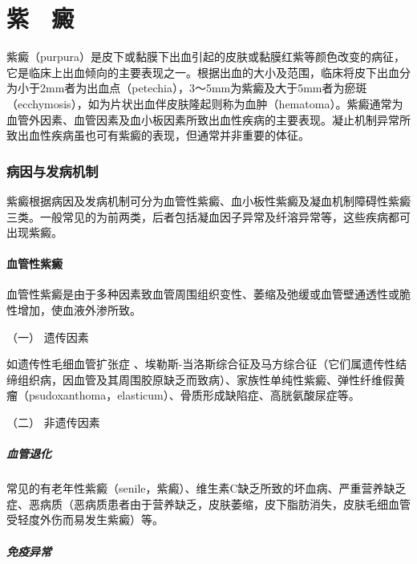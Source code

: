 \protect\hypertarget{text00036.html}{}{}

\chapter{紫　癜}

紫癜（purpura）是皮下或黏膜下出血引起的皮肤或黏膜红紫等颜色改变的病征，它是临床上出血倾向的主要表现之一。根据出血的大小及范围，临床将皮下出血分为小于2mm者为出血点（petechia），3～5mm为紫癜及大于5mm者为瘀斑（ecchymosis），如为片状出血伴皮肤隆起则称为血肿（hematoma）。紫癜通常为血管外因素、血管因素及血小板因素所致出血性疾病的主要表现。凝止机制异常所致出血性疾病虽也可有紫癜的表现，但通常并非重要的体征。

\subsection{病因与发病机制}

紫癜根据病因及发病机制可分为血管性紫癜、血小板性紫癜及凝血机制障碍性紫癜三类。一般常见的为前两类，后者包括凝血因子异常及纤溶异常等，这些疾病都可出现紫癜。

\subsubsection{血管性紫癜}

血管性紫癜是由于多种因素致血管周围组织变性、萎缩及弛缓或血管壁通透性或脆性增加，使血液外渗所致。

\hypertarget{text00036.htmlux5cux23CHP1-14-1-1-1}{}
（一） 遗传因素

如遗传性毛细血管扩张症
、埃勒斯-当洛斯综合征及马方综合征（它们属遗传性结缔组织病，因血管及其周围胶原缺乏而致病）、家族性单纯性紫癜、弹性纤维假黄瘤（psudoxanthoma，elasticum）、骨质形成缺陷症、高胱氨酸尿症等。

\hypertarget{text00036.htmlux5cux23CHP1-14-1-1-2}{}
（二） 非遗传因素

\paragraph{血管退化}

常见的有老年性紫癜（senile，紫癜）、维生素C缺乏所致的坏血病、严重营养缺乏症、恶病质（恶病质患者由于营养缺乏，皮肤萎缩，皮下脂肪消失，皮肤毛细血管受轻度外伤而易发生紫癜）等。

\paragraph{免疫异常}

